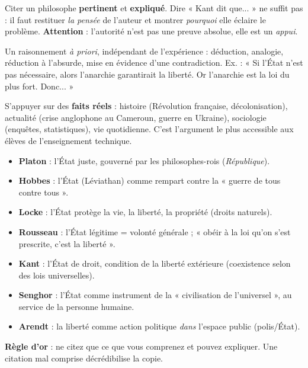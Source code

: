 \documentclass[11pt]{article}
\begin{document}
\begin{definition}
Citer un philosophe \textbf{pertinent} et \textbf{expliqué}. Dire « Kant dit que... » ne suffit pas : il faut restituer \emph{la pensée} de l'auteur et montrer \emph{pourquoi} elle éclaire le problème. \textbf{Attention} : l'autorité n'est pas une preuve absolue, elle est un \emph{appui}.
\end{definition}

\begin{definition}
Un raisonnement \emph{à priori}, indépendant de l'expérience : déduction, analogie, réduction à l'absurde, mise en évidence d'une contradiction. Ex. : « Si l'État n'est pas nécessaire, alors l'anarchie garantirait la liberté. Or l'anarchie est la loi du plus fort. Donc... »
\end{definition}

\begin{definition}
S'appuyer sur des \textbf{faits réels} : histoire (Révolution française, décolonisation), actualité (crise anglophone au Cameroun, guerre en Ukraine), sociologie (enquêtes, statistiques), vie quotidienne. C'est l'argument le plus accessible aux élèves de l'enseignement technique.
\end{definition}

\begin{savaistu}
\begin{itemize}
    \item \textbf{Platon} : l'État juste, gouverné par les philosophes-rois (\emph{République}).
    \item \textbf{Hobbes} : l'État (Léviathan) comme rempart contre la « guerre de tous contre tous ».
    \item \textbf{Locke} : l'État protège la vie, la liberté, la propriété (droits naturels).
    \item \textbf{Rousseau} : l'État légitime = volonté générale ; « obéir à la loi qu'on s'est prescrite, c'est la liberté ».
    \item \textbf{Kant} : l'État de droit, condition de la liberté extérieure (coexistence selon des lois universelles).
    \item \textbf{Senghor} : l'État comme instrument de la « civilisation de l'universel », au service de la personne humaine.
    \item \textbf{Arendt} : la liberté comme action politique \emph{dans} l'espace public (polis/État).
\end{itemize}
\textbf{Règle d'or} : ne citez que ce que vous comprenez et pouvez expliquer. Une citation mal comprise décrédibilise la copie.
\end{savaistu}
\end{document}
